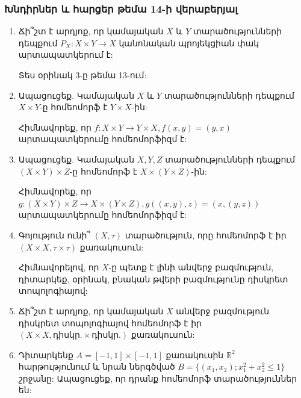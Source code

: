 \bigskip
\bigskip
\subsubsection*{Խնդիրներ և հարցեր թեմա 14-ի վերաբերյալ}

\begin{enumerate}[label=\thesection.\arabic*.]

\item Ճի՞շտ է արդյոք, որ կամայական $X$ և $Y$ տարածությունների դեպքում $P_X: X \times Y \to X$ կանոնական պրոյեկցիան փակ արտապատկերում է:

\begin{hint}
Տես օրինակ 3-ը թեմա 13-ում:
\end{hint}

\item Ապացուցեք. Կամայական $X$ և $Y$ տարածությունների դեպքում $X \times Y$-ը հոմեոմորֆ է $Y \times X$-ին:

\begin{hint}
Հիմնավորեք, որ $f: X \times Y \to Y \times X, f(x,y)=(y,x)$ արտապատկերումը հոմեոմորֆիզմ է:
\end{hint}

\item Ապացուցեք. Կամայական $X, Y, Z$ տարածությունների դեպքում $(X \times Y) \times Z$-ը հոմեոմորֆ է $X \times (Y \times Z)$-ին:

\begin{hint}
Հիմնավորեք, որ $g: (X \times Y) \times Z \to X \times (Y \times Z), g((x,y),z)=(x,(y,z))$ արտապատկերումը հոմեոմորֆիզմ է:
\end{hint}

\item Գոյություն ունի՞ $(X, \tau)$ տարածություն, որը հոմեոմորֆ է իր $(X \times X, \tau \times \tau)$ քառակուսուն:

\begin{hint}
Հիմնավորելով, որ $X$-ը պետք է լինի անվերջ բազմություն, դիտարկեք, օրինակ, բնական թվերի բազմությունը դիսկրետ տոպոլոգիայով:
\end{hint}

\item Ճի՞շտ է արդյոք, որ կամայական $X$ անվերջ բազմություն դիսկրետ տոպոլոգիայով հոմեոմորֆ է իր $(X \times X, \text{դիսկր.} \times \text{դիսկր.})$ քառակուսուն:

\item Դիտարկենք $A=[-1,1] \times [-1,1]$ քառակուսին $\mathbb{R}^2$ հարթությունում և նրան ներգծված $B=\{(x_1, x_2); x_1^2+x_2^2 \le 1\}$ շրջանը: Ապացուցեք, որ դրանք հոմեոմորֆ տարածություններ են:


\end{enumerate}
